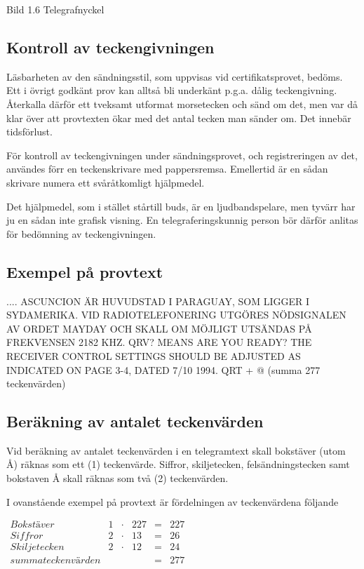 Bild 1.6 Telegrafnyckel

\subsection{Kontroll av teckengivningen}

Läsbarheten av den sändningsstil, som uppvisas vid certifikatsprovet, bedöms. Ett i
övrigt godkänt prov kan alltså bli underkänt p.g.a. dålig teckengivning. Återkalla därför
ett tveksamt utformat morsetecken och sänd om det, men var då klar över att provtexten
ökar med det antal tecken man sänder om. Det innebär tidsförlust.

För kontroll av teckengivningen under sändningsprovet, och registreringen av det,
användes förr en teckenskrivare med pappersremsa. Emellertid är en sådan skrivare
numera ett svåråtkomligt hjälpmedel.

Det hjälpmedel, som i stället stårtill buds, är en ljudbandspelare, men tyvärr har ju en
sådan inte grafisk visning. En telegraferingskunnig person bör därför anlitas för
bedömning av teckengivningen.

\subsection{Exempel på provtext}

.... ASCUNCION ÄR HUVUDSTAD I PARAGUAY, SOM LIGGER I SYDAMERIKA.
VID RADIOTELEFONERING UTGÖRES NÖDSIGNALEN AV ORDET MAYDAY
OCH SKALL OM MÖJLIGT UTSÄNDAS PÅ FREKVENSEN 2182 KHZ. QRV? MEANS
ARE YOU READY? THE RECEIVER CONTROL SETTINGS SHOULD BE
ADJUSTED AS INDICATED ON PAGE 3-4,
DATED 7/10 1994. QRT + @
(summa 277 teckenvärden)

\subsection{Beräkning av antalet teckenvärden}

Vid beräkning av antalet teckenvärden i en telegramtext skall bokstäver (utom Å) räknas
som ett (1) teckenvärde. Siffror, skiljetecken, felsändningstecken samt bokstaven
Å skall räknas som två (2) teckenvärden.

I ovanstående exempel på provtext är
fördelningen av teckenvärdena följande

$\begin{array}{lccrcr}
Bokstäver & 1 & \cdot & 227 & = & 227 \\
Siffror & 2 & \cdot & 13 & = & 26 \\
Skiljetecken & 2 & \cdot & 12 & = & 24 \\
summa teckenvärden & & & & = & 277
\end{array}
$

